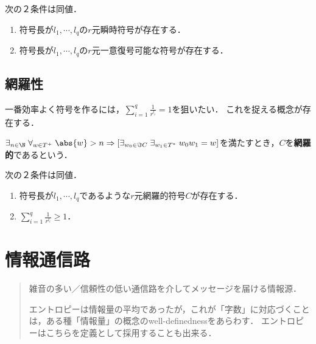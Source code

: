\documentclass[uplatex,dvipdfmx]{jsreport}
\begin{document}
\begin{corollary}\mbox{}
    次の２条件は同値．
    \begin{enumerate}
        \item 符号長が$l_1,\cdots,l_q$の$r$元瞬時符号が存在する．
        \item 符号長が$l_1,\cdots,l_q$の$r$元一意復号可能な符号が存在する．
    \end{enumerate}
\end{corollary}

\section{網羅性}

\begin{tcolorbox}[colframe=ForestGreen, colback=ForestGreen!10!white,breakable,colbacktitle=ForestGreen!40!white,coltitle=black,fonttitle=\bfseries\sffamily,
title=]
    一番効率よく符号を作るには，$\sum^q_{i=1}\frac{1}{r^{l_i}}= 1$を狙いたい．
    これを捉える概念が存在する．
\end{tcolorbox}

\begin{definition}[exhaustive]
    $\exists_{n\in\N}\;\forall_{w\in T^+}\;\abs{w}>n\Rightarrow[\exists_{w_0\in\Im C}\;\exists_{w_1\in T^*}\;w_0w_1=w]$を満たすとき，$C$を\textbf{網羅的}であるという．
\end{definition}

\begin{theorem}
    次の２条件は同値．
    \begin{enumerate}
        \item 符号長が$l_1,\cdots,l_q$であるような$r$元網羅的符号$C$が存在する．
        \item $\sum^q_{i=1}\frac{1}{r^{l_i}}\ge 1$．
    \end{enumerate}
\end{theorem}

\chapter{情報通信路}

\begin{quotation}
    雑音の多い／信頼性の低い通信路を介してメッセージを届ける情報源．

    エントロピーは情報量の平均であったが，これが「字数」に対応づくことは，ある種「情報量」の概念のwell-definednessをあらわす．
    エントロピーはこちらを定義として採用することも出来る．
\end{quotation}
\end{document}
